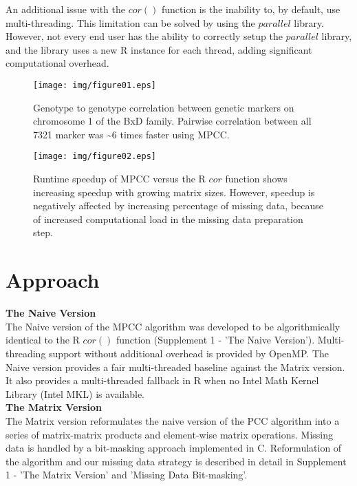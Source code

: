 \documentclass{bioinfo}
\begin{document}
An additional issue with the $cor()$ function is the inability to, by
default, use multi-threading. This limitation can be solved by using
the $parallel$ library.  However, not every end user has the ability
to correctly setup the $parallel$ library, and the library uses a new
R instance for each thread, adding significant computational overhead.
\vspace*{-5mm}
\begin{figure}[!t]
  \centerline{\texttt{[image: img/figure01.eps]}}
  \vspace*{-7mm}
  \caption{
    Genotype to genotype correlation between genetic markers on chromosome
    1 of the BxD family. Pairwise correlation between all 7321 marker was \textasciitilde{}6 times
    faster using MPCC.
  }
  \label{fig:fig1}
  \vspace*{-5mm}
\end{figure}
\begin{figure}[!t]
  \centerline{\texttt{[image: img/figure02.eps]}}
  \vspace*{-7mm}
  \caption{
    Runtime speedup of MPCC versus the R $cor$ function shows
    increasing speedup with growing matrix sizes. However,
    speedup is negatively affected by increasing percentage of
    missing data, because of increased computational load in the
    missing data preparation step.
  }
  \label{fig:fig2}
  \vspace*{-5mm}
\end{figure}

\section{Approach}

\textbf{The Naive Version}\\
The Naive version of the MPCC algorithm was developed to be
algorithmically identical to the R $cor()$ function (Supplement 1 -
'The Naive Version'). Multi-threading support without additional
overhead is provided by OpenMP. The Naive version provides a fair
multi-threaded baseline against the Matrix version. It also provides a
multi-threaded fallback in R when no Intel\textregistered{} Math
Kernel Library (Intel\textregistered{} MKL) is available.\\
\textbf{The Matrix Version}\\
The Matrix version reformulates the naive version of the PCC algorithm
into a series of matrix-matrix products and element-wise matrix operations.
Missing data is handled by a bit-masking approach implemented in C.
Reformulation of the algorithm and our missing data strategy is described
in detail in Supplement 1 - 'The Matrix Version' and 'Missing Data Bit-masking'.
\end{document}
